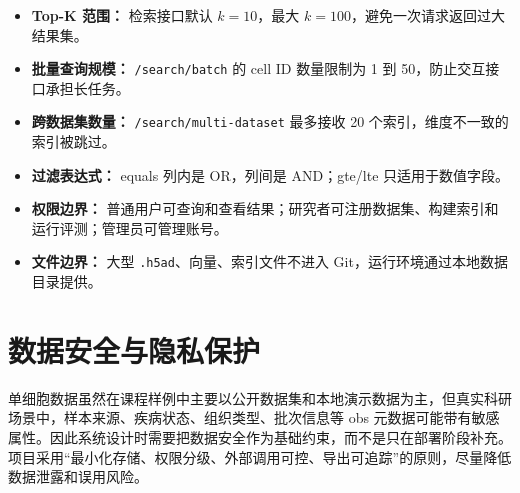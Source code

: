 \documentclass[UTF8,a4paper,12pt]{ctexrep}
\begin{document}
\begin{itemize}
  \item \textbf{Top-K 范围：} 检索接口默认 $k=10$，最大 $k=100$，避免一次请求返回过大结果集。
  \item \textbf{批量查询规模：} \texttt{/search/batch} 的 cell ID 数量限制为 1 到 50，防止交互接口承担长任务。
  \item \textbf{跨数据集数量：} \texttt{/search/multi-dataset} 最多接收 20 个索引，维度不一致的索引被跳过。
  \item \textbf{过滤表达式：} equals 列内是 OR，列间是 AND；gte/lte 只适用于数值字段。
  \item \textbf{权限边界：} 普通用户可查询和查看结果；研究者可注册数据集、构建索引和运行评测；管理员可管理账号。
  \item \textbf{文件边界：} 大型 \texttt{.h5ad}、向量、索引文件不进入 Git，运行环境通过本地数据目录提供。
\end{itemize}

\section{数据安全与隐私保护}

单细胞数据虽然在课程样例中主要以公开数据集和本地演示数据为主，但真实科研场景中，样本来源、疾病状态、组织类型、批次信息等 obs 元数据可能带有敏感属性。因此系统设计时需要把数据安全作为基础约束，而不是只在部署阶段补充。项目采用``最小化存储、权限分级、外部调用可控、导出可追踪''的原则，尽量降低数据泄露和误用风险。
\end{document}
